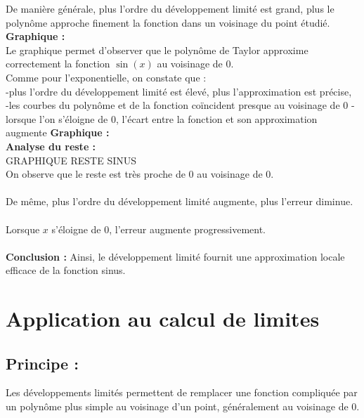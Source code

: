 \documentclass{article}
\begin{document}
De manière générale, plus l’ordre du développement limité est grand, plus le polynôme approche finement la fonction dans un voisinage du point étudié. \\


\textbf{Graphique :} \\
Le graphique permet d’observer que le polynôme de Taylor approxime correctement la fonction $\sin(x)$ au voisinage de $0$. \\
Comme pour l’exponentielle, on constate que : \\
-plus l’ordre du développement limité est élevé, plus l’approximation est précise, \\
-les courbes du polynôme et de la fonction coïncident presque au voisinage de $0$
-lorsque l’on s’éloigne de 0, l’écart entre la fonction et son approximation augmente
\textbf{Graphique :} \\



\textbf{Analyse du reste :} \\
GRAPHIQUE RESTE SINUS\\
On observe que le reste est très proche de 0 au voisinage de 0. \\ \\
De même, plus l’ordre du développement limité augmente, plus l’erreur diminue.\\ \\
Lorsque $x$ s’éloigne de 0, l’erreur augmente progressivement. \\ \\
\textbf{Conclusion :} Ainsi, le développement limité fournit une approximation locale efficace de la fonction sinus.\\






\section{Application au calcul de limites}
\subsection{Principe :}
Les développements limités permettent de remplacer une fonction compliquée par un polynôme plus simple au voisinage d’un point, généralement au voisinage de $0$. \\
 {}\\
\end{document}
